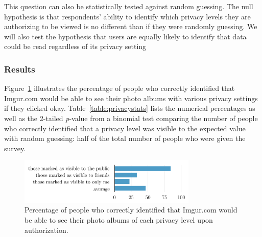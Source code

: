 \documentclass[10pt]{sig-alternate-10pt}
\begin{document}
This question can also be statistically tested against random guessing. The null hypothesis is that respondents' ability to identify which privacy levels they are authorizing to be viewed is no different than if they were randomly guessing. We will also test the hypothesis that users are equally likely to identify that data could be read regardless of its privacy setting

\subsubsection{Results}


Figure~\ref{figure:privacypercents} illustrates the percentage of people who correctly identified that Imgur.com would be able to see their photo albums with various privacy settings if they clicked okay. Table~\ref{table:privacystats} lists the numerical percentages as well as the 2-tailed \emph{p}-value from a binomial test comparing the number of people who correctly identified that a privacy level was visible to the expected value with random guessing: half of the total number of people who were given the survey.

\begin{figure}[h!]
  \centering
  \includegraphics[width=8.5cm]{privacy_percents_cosn}
  \caption{Percentage of people who correctly identified that Imgur.com would be able to see their photo albums of each privacy level upon authorization.}
  \label{figure:privacypercents}
\end{figure}
\end{document}

